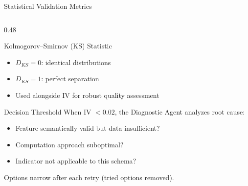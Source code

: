 \documentclass[10pt, aspectratio=169]{beamer}
\newcommand{\hlt}[1]{\textcolor{accentcyan}{#1}}
\begin{document}
\begin{frame}{Statistical Validation Metrics}
\begin{columns}[T]
\begin{column}{0.48\textwidth}
\begin{block}{Kolmogorov--Smirnov (KS) Statistic}
    \begin{itemize}\itemsep0.2em
      \item \(D_{KS} = 0\): identical distributions
      \item \(D_{KS} = 1\): perfect separation
      \item Used alongside IV for robust quality assessment
    \end{itemize}
  \end{block}

  \vspace{0.3em}
  \begin{block}{Decision Threshold}
    \scriptsize
    When IV \(< 0.02\), the \hlt{Diagnostic Agent} analyzes root cause:
    \begin{itemize}\itemsep0.1em
      \item Feature semantically valid but data insufficient?
      \item Computation approach suboptimal?
      \item Indicator not applicable to this schema?
    \end{itemize}
    Options narrow after each retry (tried options removed).
  \end{block}
\end{column}
\end{columns}
\end{frame}
\end{document}
